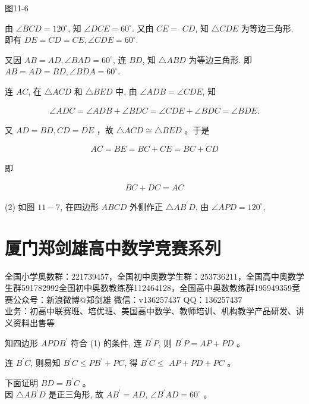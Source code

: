 \documentclass[10pt]{article}
\begin{document}
图11-6

由 $\angle B C D=120^{\circ}$, 知 $\angle D C E=60^{\circ}$. 又由 $C E=$ $C D$, 知 $\triangle C D E$ 为等边三角形. 即有 $D E=C D=C E, \angle C D E=60^{\circ}$.

又因 $A B=A D, \angle B A D=60^{\circ}$, 连 $B D$, 知 $\triangle A B D$ 为等边三角形. 即 $A B=A D=B D, \angle B D A=60^{\circ}$.

连 $A C$, 在 $\triangle A C D$ 和 $\triangle B E D$ 中, 由 $\angle A D B=\angle C D E$, 知

\begin{align*}
\angle A D C=\angle A D B+\angle B D C=\angle C D E+\angle B D C=\angle B D E .
\end{align*}

又 $A D=B D, C D=D E$ ，故 $\triangle A C D \cong \triangle B E D$ 。于是

\begin{align*}
A C=B E=B C+C E=B C+C D
\end{align*}

即

\begin{align*}
B C+D C=A C
\end{align*}

(2) 如图 $11-7$, 在四边形 $A B C D$ 外侧作正 $\triangle A B^{\prime} D$. 由 $\angle A P D=120^{\circ}$,

\section*{厦门郑剑雄高中数学竞赛系列}
全国小学奥数群：221739457，全国初中奥数学生群：253736211，全国高中奥数学生群591782992全国初中奥数教练群112464128，全国高中奥数教练群195949359竞赛公众号：新浪微博@郑剑雄 微信：v136257437 QQ：136257437\\
业务：初高中联赛班、培优班、美国高中数学、教师培训、机构教学产品研发、讲义资料出售等

知四边形 $A P D B^{\prime}$ 符合 (1) 的条件, 连 $B^{\prime} P$, 则 $B^{\prime} P=A P+P D$ 。

连 $B^{\prime} C$, 则易知 $B^{\prime} C \leqslant P B^{\prime}+P C$, 得 $B^{\prime} C \leqslant$ $A P+P D+P C$ 。

下面证明 $B D=B^{\prime} C$ 。\\
因 $\triangle A B^{\prime} D$ 是正三角形, 故 $A B^{\prime}=A D$, $\angle B^{\prime} A D=60^{\circ}$ 。
\end{document}
